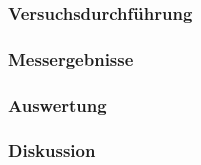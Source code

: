 \documentclass[12pt,a4paper]{article}
\begin{document}
\subsubsection*{Versuchsdurchführung}

\subsubsection*{Messergebnisse}
\subsubsection*{Auswertung}
\subsubsection*{Diskussion}
\end{document}
